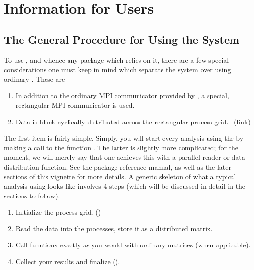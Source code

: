\section[]{Information for Users}

\subsection[]{The General Procedure for Using the System}\label{sec:basic_steps}

To use , and whence any package which relies on it, there are a few special considerations one must keep in mind which separate the system over using ordinary .  These are
\begin{enumerate}
 \item In addition to the ordinary MPI communicator provided by , a special, rectangular MPI communicator is used.~\citep{blug}
 \item Data is block cyclically distributed across the rectangular process grid.~\citep{slug} (\href{http://netlib.org/scalapack/slug/node75.html}{link})
\end{enumerate}

The first item is fairly simple.  Simply, you will start every analysis using the  by making a call to the function .  The latter is slightly more complicated; for the moment, we will merely say that one achieves this with a parallel reader or data distribution function.  See the package reference manual, as well as the later sections of this vignette for more details.
\np
A generic skeleton of what a typical analysis using  looks like involves 4 steps (which will be discussed in detail in the sections to follow):

\begin{enumerate}
\item Initialize the process grid. ()
\item Read the data into the processes, store it as a distributed matrix.
\item Call  functions exactly as you would with ordinary matrices (when applicable).
\item Collect your results and finalize ().
\end{enumerate}

